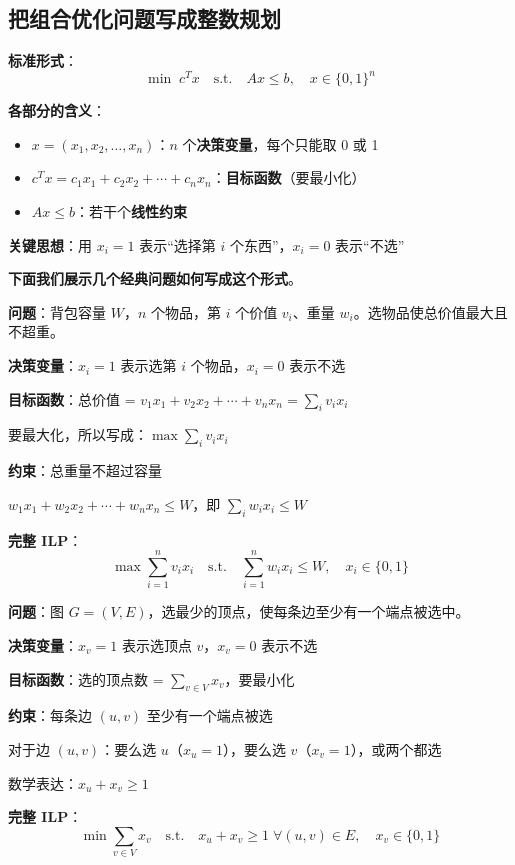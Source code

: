 \documentclass[12pt, a4paper]{ctexart}
\begin{document}
\subsection{把组合优化问题写成整数规划}

\begin{blackboard}

\textbf{标准形式}：
\[
\min \; c^T x \quad \text{s.t.} \quad Ax \leq b, \quad x \in \{0, 1\}^n
\]

\textbf{各部分的含义}：
\begin{itemize}
    \item $x = (x_1, x_2, \ldots, x_n)$：$n$ 个\textbf{决策变量}，每个只能取 0 或 1
    \item $c^T x = c_1 x_1 + c_2 x_2 + \cdots + c_n x_n$：\textbf{目标函数}（要最小化）
    \item $Ax \leq b$：若干个\textbf{线性约束}
\end{itemize}

\textbf{关键思想}：用 $x_i = 1$ 表示``选择第 $i$ 个东西''，$x_i = 0$ 表示``不选''

\textbf{下面我们展示几个经典问题如何写成这个形式}。

\end{blackboard}

\begin{blackboard}

\textbf{问题}：背包容量 $W$，$n$ 个物品，第 $i$ 个价值 $v_i$、重量 $w_i$。选物品使总价值最大且不超重。

\textbf{决策变量}：$x_i = 1$ 表示选第 $i$ 个物品，$x_i = 0$ 表示不选

\textbf{目标函数}：总价值 = $v_1 x_1 + v_2 x_2 + \cdots + v_n x_n = \sum_i v_i x_i$

要最大化，所以写成：$\max \sum_i v_i x_i$

\textbf{约束}：总重量不超过容量

$w_1 x_1 + w_2 x_2 + \cdots + w_n x_n \leq W$，即 $\sum_i w_i x_i \leq W$

\textbf{完整 ILP}：
\[
\max \sum_{i=1}^n v_i x_i \quad \text{s.t.} \quad \sum_{i=1}^n w_i x_i \leq W, \quad x_i \in \{0, 1\}
\]

\end{blackboard}

\begin{blackboard}

\textbf{问题}：图 $G = (V, E)$，选最少的顶点，使每条边至少有一个端点被选中。

\textbf{决策变量}：$x_v = 1$ 表示选顶点 $v$，$x_v = 0$ 表示不选

\textbf{目标函数}：选的顶点数 = $\sum_{v \in V} x_v$，要最小化

\textbf{约束}：每条边 $(u, v)$ 至少有一个端点被选

对于边 $(u, v)$：要么选 $u$（$x_u = 1$），要么选 $v$（$x_v = 1$），或两个都选

数学表达：$x_u + x_v \geq 1$

\textbf{完整 ILP}：
\[
\min \sum_{v \in V} x_v \quad \text{s.t.} \quad x_u + x_v \geq 1 \; \forall (u,v) \in E, \quad x_v \in \{0, 1\}
\]

\end{blackboard}
\end{document}
